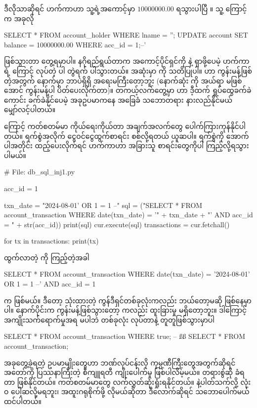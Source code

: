 ဒီလိုသာဆိုရင် ဟက်ကာဟာ သူ့ရဲ့အကောင့်မှာ $10000000.00$ ရသွားပါပြီ \fEn{(!)}။ သူ့  ကြောင့်  က အခုလို
\begin{sql}
SELECT * FROM account_holder WHERE lname = '';
UPDATE account SET balance = 10000000.00 WHERE acc_id = 1;--'
\end{sql}
ဖြစ်သွားတာ တွေ့ရမှာပါ။ နဂိုရည်ရွယ်တာက အကောင့်ပိုင်ရှင်ကို  နဲ့ ရှာဖို့ပေမဲ့ ဟက်ကာရဲ့  ကြောင့်  လုပ်တဲ့  ပါ တွဲရက် ပါသွားတယ်။ အဆုံးမှာ  ကို သတိပြုပါ။ \fCode{--} ဟာ  ကွန်းမန့်ဖြစ်တဲ့အတွက် နောက်မှာ ဘာပဲရှိရှိ အရေးမကြီးတော့ဘူး (နောက်ဆုံး  ကို အယ်ရာ မဖြစ်အောင် ကွန်းမန့်ပါ ပိတ်ပေးလိုက်တာ)။ တကယ့်လက်တွေ့မှာ  ဟာ ဒီ့ထက် ရှုပ်ထွေခက်ခဲကောင်း ခက်ခဲနိုင်ပေမဲ့ အခုဥပမာကနေ အခြေခံ သဘောတရား နားလည်နိုင်မယ် မျှော်လင့်ပါတယ်။

 ကြောင့် ကတ်စတမ်မာ ကိုယ်ရေးကိုယ်တာ အချက်အလက်တွေ ပေါက်ကြားကုန်နိုင်ပါတယ်။ ရက်စွဲအလိုက် ငွေဝင်ငွေထွက်စာရင်း စစ်လို့ရတယ် ယူဆပါ။ ရက်စွဲကို အောက်ပါအတိုင်း ထည့်ပေးလိုက်ရင် ဟက်ကာဟာ အခြားသူ စာရင်းတွေကိုပါ ကြည့်လို့ရသွားပါမယ်။ 
%
\begin{py}
# File: db_sql_inj1.py 

acc_id = 1

txn_date = "2024-08-01' OR 1 = 1 --"
sql = ("SELECT * FROM account_transaction WHERE date(txn_date) = '" 
       + txn_date + "' AND acc_id = " + str(acc_id))
print(sql)
cur.execute(sql)
transactions = cur.fetchall()

for tx in transactions:
    print(tx)
\end{py}
%
ထွက်လာတဲ့  ကို ကြည့်တဲ့အခါ
\begin{sql}
SELECT * FROM account_transaction 
WHERE date(txn_date) = '2024-08-01' OR 1 = 1 --' AND acc_id = 1
\end{sql}
 က  ဖြစ်မယ်။ ဒီတော့  သုံးထားတဲ့  ကွန်ဒီရှင်တစ်ခုလုံးကလည်း ဘယ်တော့မဆို  ဖြစ်နေမှာပါ။ နောက်ပိုင်းက ကွန်းမန့်ဖြစ်သွားတော့  ကလည်း ထူးခြားမှု မရှိတော့ဘူး။ ဒါကြောင့် အကျိုးသက်ရောက်မှုအရ  မပါဘဲ  တစ်ခုလုံး  လုပ်တာနဲ့ တူတူဖြစ်သွားမှာပါ
\begin{sql}
SELECT * FROM account_transaction WHERE true;
-- ßß
SELECT * FROM account_transaction;
\end{sql}

အခုတွေ့ခဲ့ရတဲ့ ဥပမာမျိုးတွေဟာ ဘဏ်လုပ်ငန်းလို ကုမ္ပဏီကြီးတွေအတွက်ဆိုရင် အတော်ကို ပြဿ\allowbreak နာကြီးတဲ့ စီကျူရတီ ကျိုးပေါက်မှု ဖြစ်ပါလိမ့်မယ်။ တရားစွဲဆို ခံရတာ ဖြစ်နိုင်တယ်။ ကတ်စတမ်မာတွေ လက်လွှတ်ဆုံးရှုံးရနိုင်တယ်။  နဲ့ပါတ်သက်လို့ လုံးဝ ပေါ့ဆလို့မရဘူး၊ အထူးဂရုစိုက်ဖို့ လိုမယ်ဆိုတာ ဒီလောက်ဆိုရင်  သဘောပေါက်မယ် ထင်ပါတယ်။ 

